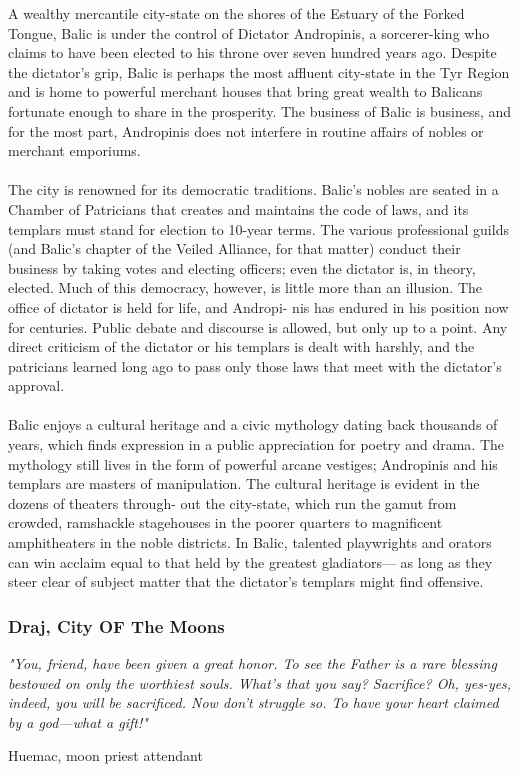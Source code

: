 \begin{multicols}{2}
A wealthy mercantile city-state on the shores of the
Estuary of the Forked Tongue, Balic is under the
control of Dictator Andropinis, a sorcerer-king who
claims to have been elected to his throne over seven
hundred years ago. Despite the dictator’s grip, Balic is
perhaps the most affluent city-state in the Tyr Region
and is home to powerful merchant houses that bring
great wealth to Balicans fortunate enough to share in
the prosperity. The business of Balic is business, and
for the most part, Andropinis does not interfere in
routine affairs of nobles or merchant emporiums.\\
\\
The city is renowned for its democratic traditions.
Balic’s nobles are seated in a Chamber of Patricians
that creates and maintains the code of laws, and its
templars must stand for election to 10-year terms.
The various professional guilds (and Balic’s chapter
of the Veiled Alliance, for that matter) conduct
their business by taking votes and electing officers;
even the dictator is, in theory, elected. Much of this
democracy, however, is little more than an illusion.
The office of dictator is held for life, and Andropi-
nis has endured in his position now for centuries.
Public debate and discourse is allowed, but only up
to a point. Any direct criticism of the dictator or his
templars is dealt with harshly, and the patricians
learned long ago to pass only those laws that meet
with the dictator's approval.\\
\\
Balic enjoys a cultural heritage and a civic
mythology dating back thousands of years, which
finds expression in a public appreciation for poetry
and drama. The mythology still lives in the form
of powerful arcane vestiges; Andropinis and his
templars are masters of manipulation. The cultural
heritage is evident in the dozens of theaters through-
out the city-state, which run the gamut from crowded,
ramshackle stagehouses in the poorer quarters to
magnificent amphitheaters in the noble districts.
In Balic, talented playwrights and orators can win
acclaim equal to that held by the greatest gladiators—
as long as they steer clear of subject matter that the
dictator’s templars might find offensive.\\

\subsubsection{Draj, City OF The Moons}
\epigraph{\textit{
"You, friend, have been given a great honor. To see the
Father is a rare blessing bestowed on only the worthiest
souls. What’s that you say? Sacrifice? Oh, yes-yes, indeed,
you will be sacrificed. Now don’t struggle so. To have your
heart claimed by a god—what a gift!"} }
{ Huemac, moon priest attendant }


\end{multicols}
